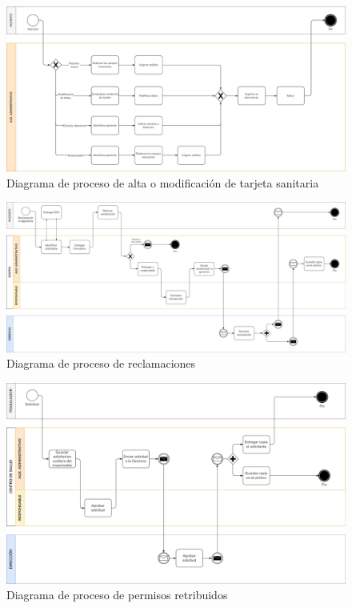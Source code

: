 \documentclass[12pt, a4paper, twoside, openright]{report}
\begin{document}
\begin{figure}
    \centering
    \begin{sideways}
        \includegraphics[width=0.95\textheight]{img/proceso-tarjeta.png}
    \end{sideways}
    \caption{Diagrama de proceso de alta o modificación de tarjeta sanitaria}
    \label{fig:proceso-tarjeta}
\end{figure}

\begin{figure}
    \centering
    \begin{sideways}
        \includegraphics[width=0.95\textheight]{img/proceso-reclamaciones.png}
    \end{sideways}
    \caption{Diagrama de proceso de reclamaciones}
    \label{fig:proceso-reclamaciones}
\end{figure}

\begin{figure}
    \centering
    \begin{sideways}
        \includegraphics[width=0.95\textheight]{img/proceso-permisos.png}
    \end{sideways}
    \caption{Diagrama de proceso de permisos retribuidos}
    \label{fig:proceso-permisos}
\end{figure}
\end{document}
